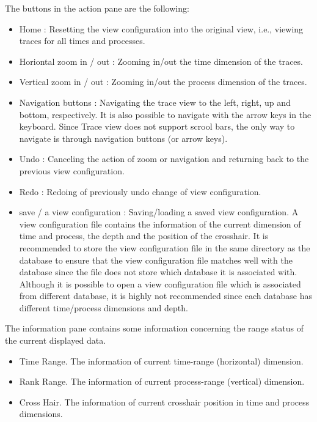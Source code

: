 \documentclass[english]{article}
\begin{document}
The buttons in the action pane are the following:
\begin{itemize}

\item Home : Resetting the view configuration into the original view, i.e., viewing traces for all times and processes.
\item Horiontal zoom in / out : Zooming in/out the time dimension of the traces. 
\item Vertical zoom in / out : Zooming in/out the process dimension of the traces.
\item Navigation buttons : Navigating the trace view to the left, right, up and bottom, respectively. It is also possible to navigate with the arrow keys in the keyboard. Since Trace view does not support scrool bars, the only way to navigate is through navigation buttons (or arrow keys).
\item Undo : Canceling the action of zoom or navigation and returning back to the previous view configuration.
\item Redo : Redoing of previously undo change of view configuration.
\item save  / a view configuration : Saving/loading a saved view configuration. 
A view configuration file contains the information of the current dimension of time and process, the depth and the position of the crosshair. 
It is recommended to store the view configuration file in the same directory as the database to ensure that the view configuration file matches well with the database since the file does not store which database it is associated with. 
Although it is possible to open a view configuration file which is associated from different database, it is highly not recommended since each database has different time/process dimensions and depth.


\end{itemize}

The information pane contains some information concerning the range status of the current displayed data.
\begin{itemize}
 \item Time Range. The information of current time-range (horizontal) dimension. 
 \item Rank Range. The information of current process-range (vertical) dimension. 
 \item Cross Hair. The information of current crosshair position in time and process dimensions. 
\end{itemize}
\end{document}
